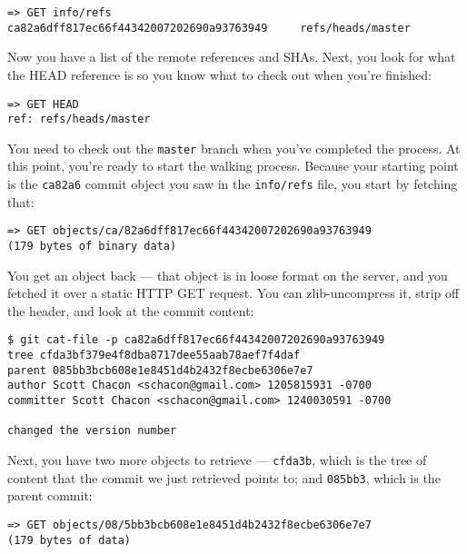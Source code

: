 \documentclass[a4paper]{book}
\begin{document}
\begin{shaded}\begin{verbatim}
=> GET info/refs
ca82a6dff817ec66f44342007202690a93763949     refs/heads/master
\end{verbatim}\end{shaded}

Now you have a list of the remote references and SHAs. Next, you look for what the HEAD reference is so you know what to check out when you're finished:

\begin{shaded}\begin{verbatim}
=> GET HEAD
ref: refs/heads/master
\end{verbatim}\end{shaded}

You need to check out the \texttt{master} branch when you've completed the process. At this point, you're ready to start the walking process. Because your starting point is the \texttt{ca82a6} commit object you saw in the \texttt{info/refs} file, you start by fetching that:

\begin{shaded}\begin{verbatim}
=> GET objects/ca/82a6dff817ec66f44342007202690a93763949
(179 bytes of binary data)
\end{verbatim}\end{shaded}

You get an object back --- that object is in loose format on the server, and you fetched it over a static HTTP GET request. You can zlib-uncompress it, strip off the header, and look at the commit content:

\begin{shaded}\begin{verbatim}
$ git cat-file -p ca82a6dff817ec66f44342007202690a93763949
tree cfda3bf379e4f8dba8717dee55aab78aef7f4daf
parent 085bb3bcb608e1e8451d4b2432f8ecbe6306e7e7
author Scott Chacon <schacon@gmail.com> 1205815931 -0700
committer Scott Chacon <schacon@gmail.com> 1240030591 -0700

changed the version number
\end{verbatim}\end{shaded}

Next, you have two more objects to retrieve --- \texttt{cfda3b}, which is the tree of content that the commit we just retrieved points to; and \texttt{085bb3}, which is the parent commit:

\begin{shaded}\begin{verbatim}
=> GET objects/08/5bb3bcb608e1e8451d4b2432f8ecbe6306e7e7
(179 bytes of data)
\end{verbatim}\end{shaded}
\end{document}
